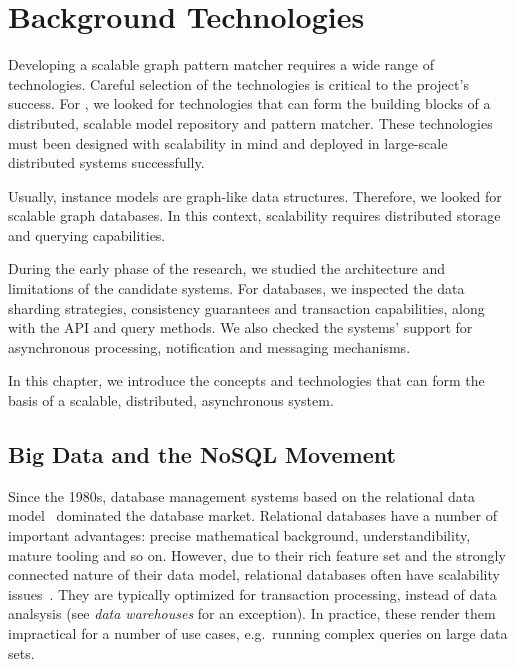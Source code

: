 \chapter{Background Technologies}
\label{chap:background-technologies}

Developing a scalable graph pattern matcher requires a wide range of technologies. Careful selection of the technologies is critical to the project's success. For \iqd{}, we looked for technologies that can form the building blocks of a distributed, scalable model repository and pattern matcher. These technologies must been designed with scalability in mind and deployed in large-scale distributed systems successfully. %

Usually, instance models are graph-like data structures. Therefore, we looked for scalable graph databases. In this context, scalability requires distributed storage and querying capabilities.

During the early phase of the research, we studied the architecture and limitations of the candidate systems. For databases, we inspected the data sharding strategies, consistency guarantees and transaction capabilities, along with the API and query methods. We also checked the systems' support for asynchronous processing, notification and messaging mechanisms.

In this chapter, we introduce the concepts and technologies that can form the basis of a scalable, distributed, asynchronous system. %


\section{Big Data and the NoSQL Movement}
\label{nosql}

Since the 1980s, database management systems based on the relational data model~\cite{Codd:1970:RMD:362384.362685} dominated the database market. Relational databases have a number of important advantages: precise mathematical background, understandibility, mature tooling and so on. However, due to their rich feature set and the strongly connected nature of their data model, relational databases often have scalability issues~\cite{Jacobs:2009:PBD:1536616.1536632, Sakr13}. They are typically optimized for transaction processing, instead of data analsysis (see \emph{data warehouses} for an exception). In practice, these render them impractical for a number of use cases, e.g.\ running complex queries on large data sets.


